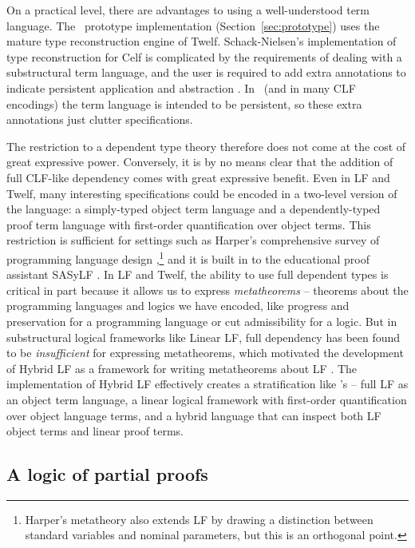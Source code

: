 On a practical level, there are advantages to using a well-understood
term language. The \sls~prototype implementation
(Section~\ref{sec:prototype}) uses the mature type reconstruction
engine of Twelf. Schack-Nielsen's implementation of type
reconstruction for Celf is complicated by the requirements of dealing
with a substructural term language, and the user is required to add
extra annotations to indicate persistent application and abstraction
\cite{schacknielsen08celf}. In \sls~(and in many CLF encodings) the
term language is intended to be persistent, so these extra annotations
just clutter specifications.

The restriction to a dependent type theory therefore does not come at
the cost of great expressive power. Conversely, it is by no means
clear that the addition of full CLF-like dependency comes with great
expressive benefit. Even in LF and Twelf, many interesting
specifications could be encoded in a two-level version of the
language: a simply-typed object term language and a dependently-typed
proof term language with first-order quantification over object
terms. This restriction is sufficient for settings such as Harper's
comprehensive survey of programming language design
\cite{harper12practical},\footnote{Harper's metatheory also extends LF
  by drawing a distinction between standard variables and nominal
  parameters, but this is an orthogonal point.} and it is built in to
the educational proof assistant SASyLF \cite{aldrich08sasylf}. In LF
and Twelf, the ability to use full dependent types is critical in part
because it allows us to express {\it metatheorems} -- theorems about
the programming languages and logics we have encoded, like progress
and preservation for a programming language or cut admissibility for a
logic. But in substructural logical frameworks like Linear LF, full
dependency has been found to be {\it insufficient} for expressing
metatheorems, which motivated the development of Hybrid LF as a
framework for writing metatheorems about LF \cite{reed09hybrid}. The
implementation of Hybrid LF effectively creates a stratification like
\sls's -- full LF as an object term language, a linear logical
framework with first-order quantification over object language terms,
and a hybrid language that can inspect both LF object terms and linear
proof terms. 


\subsection{A logic of partial proofs}

